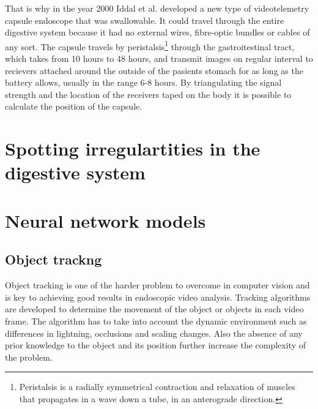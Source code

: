 \documentclass[english, a4paper]{report}
\begin{document}
That is why in the year 2000 Iddal et al.\cite{WirelessCapsule00} developed a new type of videotelemetry capsule endoscope that was swallowable. It could travel through the entire digestive system because it had no external wires, fibre-optic bundles or cables of any sort. The capsule travels by peristalsis\footnote{Peristalsis is a radially symmetrical contraction and relaxation of muscles that propagates in a wave down a tube, in an anterograde direction.} through the gastroitestinal tract, which takes from 10 hours to 48 hours, and transmit images on regular interval to recievers attached around the outside of the pasients stomach for as long as the battery allows, usually in the range 6-8 hours. By triangulating the signal strength and the location of the receivers taped on the body it is possible to calculate the position of the capsule.


\section{Spotting irregulartities in the digestive system}








\section{Neural network models}



\subsection{Object trackng}
Object tracking is one of the harder problem to overcome in computer vision and is key to achieving good results in endoscopic video analysis. Tracking algorithms are developed to determine the movement of the object or objects in each video frame. The algorithm has to take into account the dynamic environment such as differences in lightning, occlusions and scaling changes. Also the absence of any prior knowledge to the object and its position further increase the complexity of the problem.
\end{document}
